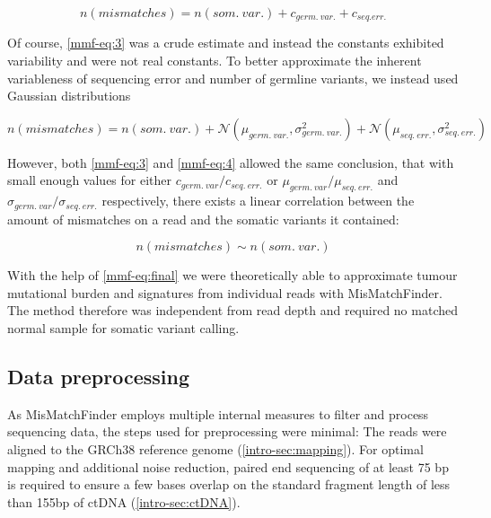 \begin{equation}
n(mismatches) = n(som.~var.) + c_{germ.~var.} + c_{seq. err.}
\label{mmf-eq:3}
\end{equation}\myequation[\ref{mmf-eq:3}]{MisMatchFinder: germline variants}

Of course, \autoref{mmf-eq:3} was a crude estimate and instead the constants exhibited variability and were not real constants. To better approximate the inherent variableness of sequencing error and number of germline variants, we instead used Gaussian distributions 

\begin{equation}
n(mismatches) = n(som.~var.) + \mathcal{N}(\mu_{germ.~var.}, \sigma_{germ.~var.}^{2}) + \mathcal{N}(\mu_{seq.~err.}, \sigma_{seq.~err.}^{2})
\label{mmf-eq:4}
\end{equation}
\myequation[\ref{mmf-eq:4}]{MisMatchFinder: number of mismatches with distributions}

However, both \autoref{mmf-eq:3} and \ref{mmf-eq:4} allowed the same conclusion, that with small enough values for either $c_{germ.~var}/c_{seq.~err.}$ or $\mu_{germ.~var}/\mu_{seq.~err.}$ and $\sigma_{germ.~var}/\sigma_{seq.~err.}$ respectively, there exists a linear correlation between the amount of mismatches on a read and the somatic variants it contained:

\begin{equation}
n(mismatches) \sim n(som.~var.)
\label{mmf-eq:final}
\end{equation}
\myequation[\ref{mmf-eq:final}]{MisMatchFinder: number of mismatches correlation with somatic variants}

With the help of \autoref{mmf-eq:final} we were theoretically able to approximate tumour mutational burden and signatures from individual reads with MisMatchFinder. The method therefore was independent from read depth and required no matched normal sample for somatic variant calling.

\subsection{Data preprocessing}
As MisMatchFinder employs multiple internal measures to filter and process sequencing data, the steps used for preprocessing were minimal: The reads were  aligned to the GRCh38 reference genome (\autoref{intro-sec:mapping}). For optimal mapping and additional noise reduction, paired end sequencing of at least 75 bp is required to ensure a few bases overlap on the standard fragment length of less than 155bp of ctDNA (\autoref{intro-sec:ctDNA}). 

